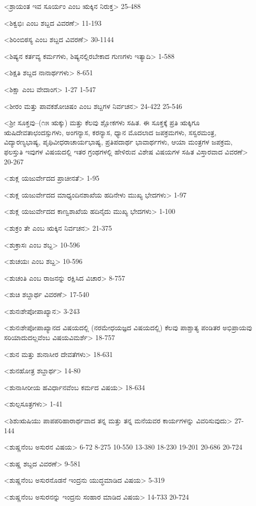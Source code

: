<ಶ್ರಾಯಂತ ಇವ ಸೂರ್ಯಂ ಎಂಬ ಋಕ್ಕಿನ ನಿರುಕ್ತ>
25-488

<ಶಿಕ್ವಭಿಃ ಎಂಬ ಶಬ್ದದ ವಿವರಣೆ>
11-193

<ಶಿರಿಂಬಿಠಸ್ಯ ಎಂಬ ಶಬ್ದದ ವಿವರಣೆ>
30-1144

<ಶಿಷ್ಯನ ಕರ್ತವ್ಯ ಕರ್ಮಗಳು, ಶಿಷ್ಯನಲ್ಲಿರಬೇಕಾದ ಗುಣಗಳು ಇತ್ಯಾದಿ>
1-588

<ಶಿಕ್ಷತಿ ಶಬ್ದದ ನಾನಾರ್ಥಗಳು>
8-651

<ಶಿಕ್ಷಾ ಎಂಬ ವೇದಾಂಗ>
1-27
1-547

<ಶೀರಂ ಮತ್ತು ಪಾವಕಶೋಚಿಷಂ ಎಂಬ ಶಬ್ದಗಳ ನಿರ್ವಚನ>
24-422
25-546

<ಶ್ರೀ ಸೂಕ್ತವು–(೧೫ ಋಕ್ಕು) ಮತ್ತು ಕೆಲವು ಶ್ಲೋಕಗಳು ಸಹಿತ. ಈ ಸೂಕ್ತಕ್ಕೆ ಪ್ರತಿ ಋಕ್ಕಿಗೂ ಋಷಿದೇವತಾಛಂದಸ್ಸುಗಳು, ಅಂಗನ್ಯಾಸ, ಕರನ್ಯಾಸ, ಧ್ಯಾನ ಮೊದಲಾದ ಜಪಕ್ರಮಗಳು, ಸಸ್ವರಮಂತ್ರ, ವಿದ್ಯಾರಣ್ಯಭಾಷ್ಯ, ಪೃಥಿವೀಧರಾಚಾರ್ಯಭಾಷ್ಯ, ಪ್ರತಿಪದಾರ್ಥ ಭಾವಾರ್ಥಗಳು, ಆಯಾ ಮಂತ್ರಗಳ ಜಪಕ್ರಮ, ಫಲಸ್ತುತಿ ಇವುಗಳ ವಿಷಯದಲ್ಲಿ ಇತರ ಗ್ರಂಥಗಳಲ್ಲಿ ಹೇಳಿರುವ ವಿಶೇಷ ವಿಷಯಗಳ ಸಹಿತ ವಿಸ್ತಾರವಾದ ವಿವರಣೆ>
20-267

<ಶುಕ್ಲ ಯಜುರ್ವೇದದ ಪ್ರಾಚೀನತೆ>
1-95

<ಶುಕ್ಲ ಯಜುರ್ವೇದದ ಮಾಧ್ಯಂದಿನಶಾಖೆಯ ಹದಿನೇಳು ಮುಖ್ಯ ಭೇದಗಳು>
1-97

<ಶುಕ್ಲ ಯಜುರ್ವೇದದ ಕಾಣ್ವಶಾಖೆಯ ಹದಿನೈದು ಮುಖ್ಯ ಭೇದಗಳು>
1-100

<ಶುಕ್ರಂ ತೇ ಎಂಬ ಋಕ್ಕಿನ ನಿರ್ವಚನ>
21-375

<ಶುಕ್ರಾಸಃ ಎಂಬ ಶಬ್ದ>
10-596

<ಶುಚಯಃ ಎಂಬ ಶಬ್ದ>
10-596

<ಶುಚಂತಿ ಎಂಬ ರಾಜನನ್ನು ರಕ್ಷಿಸಿದ ವಿಚಾರ>
8-757

<ಶುಚಿ ಶಬ್ದಾರ್ಥ ವಿವರಣೆ>
17-540

<ಶುನಃಶೇಪೋಪಾಖ್ಯಾನ>
3-243

<ಶುನಃಶೇಪೋಪಾಖ್ಯಾನದ ವಿಷಯದಲ್ಲಿ (ನರಮೇಧಯಜ್ಞದ ವಿಷಯದಲ್ಲಿ) ಕೆಲವು ಪಾಶ್ಚಾತ್ಯ ಪಂಡಿತರ ಅಭಿಪ್ರಾಯವು ಸರಿಯಾದುದಲ್ಲವೆಂಬ ವಿಷಯವಿಮರ್ಶೆ>
18-757

<ಶುನ ಮತ್ತು ಶುನಾಸೀರ ದೇವತೆಗಳು>
18-631

<ಶುನಹೋತ್ರ ಶಬ್ದಾರ್ಥ>
14-80

<ಶುನಾಸೀರೀಯ ಹವಿರ್ಧಾನವೆಂಬ ಕರ್ಮದ ವಿಷಯ>
18-634

<ಶುಲ್ಪಸೂತ್ರಗಳು>
1-41

<ಶಿಶುಋಷಿಯು ಪಾಪಪರಿಹಾರಾರ್ಥವಾದ ತನ್ನ ಮತ್ತು ತನ್ನ ಮನೆಯವರ ಕಾರ್ಯಗಳನ್ನು ವಿವರಿಸುವುದು>
27-144

<ಶುಷ್ಣನೆಂಬ ಅಸುರನ ವಿಷಯ>
6-72
8-275 
10-550 
13-380
18-230
19-201
20-686
20-724


<ಶುಷ್ಣ ಶಬ್ದದ ವಿವರಣೆ>
9-581


<ಶುಷ್ಣನೆಂಬ ಅಸುರನೊಡನೆ ಇಂದ್ರನು ಯುದ್ಧಮಾಡಿದ ವಿಷಯ>
5-319

<ಶುಷ್ಣನೆಂಬ ಅಸುರನನ್ನು ಇಂದ್ರನು ಸಂಹಾರ ಮಾಡಿದ ವಿಷಯ>
14-733
20-724

